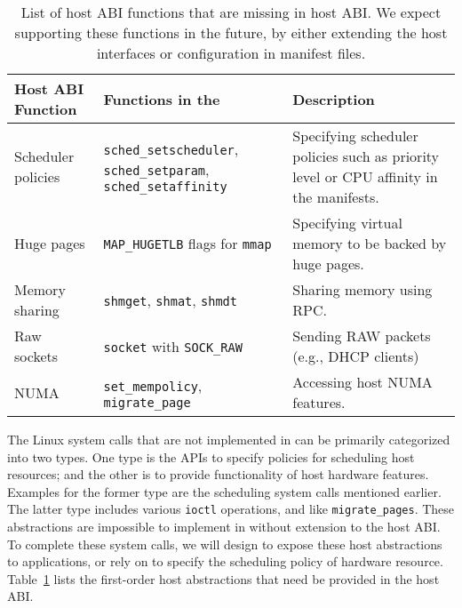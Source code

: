 \begin{table}[t]
\footnotesize
\centering
\begin{tabular}{|p{1.2in}|p{2.4in}|p{2.4in}|}
\hline
{\bf Host ABI Function} & {\bf Functions in the \libos{}} & {\bf Description} \\
\hline
Scheduler policies & {\tt sched\_setscheduler}, {\tt sched\_setparam}, {\tt sched\_setaffinity} & Specifying scheduler policies such as priority level or CPU affinity in the manifests.\\
\hline
Huge pages & {\tt MAP\_HUGETLB} flags for {\tt mmap} & Specifying virtual memory to be backed by huge pages. \\
\hline
Memory sharing & {\tt shmget}, {\tt shmat}, {\tt shmdt} & Sharing memory using RPC. \\
\hline
Raw sockets & {\tt socket} with {\tt SOCK\_RAW}  & Sending RAW packets (e.g., DHCP clients) \\
\hline
NUMA & {\tt set\_mempolicy}, {\tt migrate\_page} & Accessing host NUMA features. \\
\hline
\end{tabular}
\caption[List of host ABI functions to be added in \graphene{} as future works]
{List of host ABI functions that are missing in \graphene{} host ABI.
We expect supporting these functions in the future,
by either extending the host interfaces or configuration in manifest files.}
\label{tab:future:abi}
\end{table}


The Linux system calls that are not implemented in \graphene{}
can be primarily categorized into two types.
One type is the APIs
to specify policies for scheduling host resources;
and the other is to provide functionality of host hardware features.
Examples for the former type are the scheduling system calls mentioned earlier.
The latter type includes
various {\tt ioctl} operations,
and  like {\tt migrate\_pages}.
These abstractions are impossible to implement in \liboses{}
without extension to the host ABI.
To complete these system calls,
we will design  to expose these host abstractions
to applications,
or rely on 
to specify the scheduling policy of hardware resource.
Table~\ref{tab:future:abi} lists the first-order host abstractions
that need be provided in the \graphene{} host ABI.


